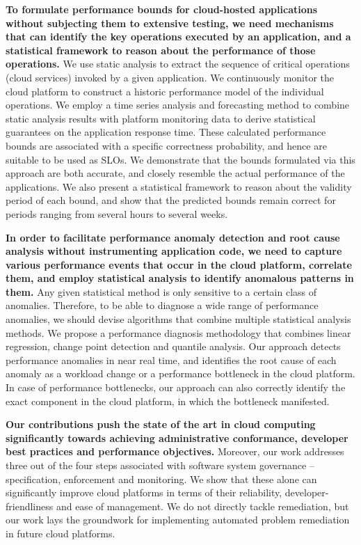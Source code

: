 \textbf{To formulate performance bounds for cloud-hosted applications without subjecting them to extensive testing,
we need mechanisms that can identify the key operations executed by an application, and a
statistical framework to reason about the performance of those operations.} We use static
analysis to extract the sequence of critical operations (cloud services) invoked by a given application.
We continuously monitor the cloud platform to construct a historic performance model of the individual operations.
We employ a time series analysis and forecasting method to combine static analysis results with
platform monitoring data to
derive statistical guarantees on the application response time. These calculated performance
bounds are associated with a specific correctness probability, and hence are suitable to be used
as SLOs. We demonstrate that the bounds formulated via this approach are 
both accurate, and closely resemble the actual performance of the applications. We also present a statistical framework
to reason about the validity period of each bound, and show that the predicted bounds
remain correct for periods ranging from several hours to several weeks.

\textbf{In order to facilitate performance anomaly detection and root cause analysis without instrumenting
application code, we need to capture various performance events that occur in the cloud platform,
correlate them, and employ statistical analysis to identify anomalous patterns in them.} Any given statistical
method is only sensitive to a certain class of anomalies. Therefore, to be able to diagnose a wide range of
performance anomalies, we should devise algorithms that combine multiple statistical analysis
methods. We propose a performance diagnosis methodology that combines linear regression, change point
detection and quantile analysis. Our approach detects performance anomalies in near real time,
and identifies the root cause of each anomaly as a workload change or a performance bottleneck
in the cloud platform. In case of performance bottlenecks, our approach can also correctly identify
the exact component in the cloud platform, in which the bottleneck manifested.

\textbf{Our contributions push the state of the art in cloud computing significantly towards achieving
administrative conformance, developer best practices and performance objectives.} Moreover,
our work addresses three out of the four steps associated with software system governance --
specification, enforcement and monitoring. We show that these alone can significantly improve cloud platforms
in terms of their reliability, developer-friendliness and ease of management. 
We do not directly tackle remediation, but our work
lays the groundwork for implementing automated problem remediation in future cloud platforms.
